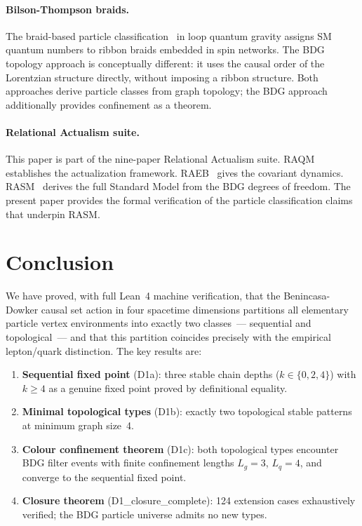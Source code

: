 \documentclass[11pt,a4paper]{article}
\begin{document}
\paragraph{Bilson-Thompson braids.}
The braid-based particle classification~\citep{BilsonThompson2005}
in loop quantum gravity assigns SM quantum numbers to ribbon braids
embedded in spin networks. The BDG topology approach is conceptually
different: it uses the causal order of the Lorentzian structure directly,
without imposing a ribbon structure. Both approaches derive particle
classes from graph topology; the BDG approach additionally provides
confinement as a theorem.

\paragraph{Relational Actualism suite.}
This paper is part of the nine-paper Relational Actualism suite.
RAQM~\citep{Sandeman2026RAQM} establishes the actualization framework.
RAEB~\citep{Sandeman2026RAEB} gives the covariant dynamics.
RASM~\citep{Sandeman2026RASM} derives the full Standard Model from the
BDG degrees of freedom. The present paper provides the formal
verification of the particle classification claims that underpin RASM.

\section{Conclusion}
\label{sec:conclusion}

We have proved, with full Lean~4 machine verification, that the
Benincasa-Dowker causal set action in four spacetime dimensions
partitions all elementary particle vertex environments into exactly
two classes~--- sequential and topological~--- and that this partition
coincides precisely with the empirical lepton/quark distinction.
The key results are:

\begin{enumerate}
  \item \textbf{Sequential fixed point} (D1a): three stable chain depths
    ($k \in \{0,2,4\}$) with $k \geq 4$ as a genuine fixed point proved
    by definitional equality.
  \item \textbf{Minimal topological types} (D1b): exactly two topological
    stable patterns at minimum graph size~4.
  \item \textbf{Colour confinement theorem} (D1c): both topological types
    encounter BDG filter events with finite confinement lengths $L_g=3$,
    $L_q=4$, and converge to the sequential fixed point.
  \item \textbf{Closure theorem} (D1\_closure\_complete): 124 extension
    cases exhaustively verified; the BDG particle universe admits no new
    types.
\end{enumerate}
\end{document}
